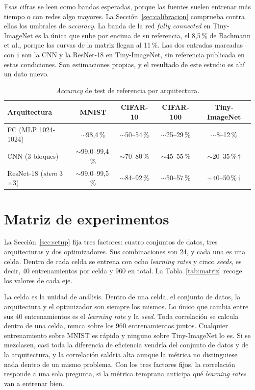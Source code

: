 Esas cifras se leen como bandas esperadas, porque las fuentes suelen entrenar más tiempo o con redes algo mayores. La Sección~\ref{sec:calibracion} comprueba contra ellas los umbrales de \emph{accuracy}. La banda de la red \emph{fully connected} en Tiny-ImageNet es la única que sube por encima de su referencia, el 8,5\,\% de Bachmann et al., porque las curvas de la matriz llegan al 11\,\%. Las dos entradas marcadas con $\dagger$ son la CNN y la ResNet-18 en Tiny-ImageNet, sin referencia publicada en estas condiciones. Son estimaciones propias, y el resultado de este estudio es ahí un dato nuevo.

\begin{table}[ht]
\centering
\small
\caption{\emph{Accuracy} de test de referencia por arquitectura.}
\label{tab:referencias}
\begin{tabular}{lcccc}
\toprule
\textbf{Arquitectura} & \textbf{MNIST} & \textbf{CIFAR-10} & \textbf{CIFAR-100} & \textbf{Tiny-ImageNet} \\
\midrule
FC (MLP 1024-1024)          & $\sim$98,4\,\%       & $\sim$50--54\,\% & $\sim$25--29\,\% & $\sim$8--12\,\% \\
CNN (3 bloques)             & $\sim$99,0--99,4\,\% & $\sim$70--80\,\% & $\sim$45--55\,\% & $\sim$20--35\,\%\,$\dagger$ \\
ResNet-18 (\emph{stem} 3$\times$3) & $\sim$99,0--99,5\,\% & $\sim$84--92\,\% & $\sim$50--57\,\% & $\sim$40--50\,\%\,$\dagger$ \\
\bottomrule
\end{tabular}
\end{table}

\section{Matriz de experimentos}
\label{sec:matriz}

La Sección~\ref{sec:setup} fija tres factores: cuatro conjuntos de datos, tres arquitecturas y dos optimizadores. Sus combinaciones son 24, y cada una es una celda. Dentro de cada celda se entrena con ocho \emph{learning rates} y cinco \emph{seeds}, es decir, 40 entrenamientos por celda y 960 en total. La Tabla~\ref{tab:matriz} recoge los valores de cada eje.

La celda es la unidad de análisis. Dentro de una celda, el conjunto de datos, la arquitectura y el optimizador son siempre los mismos. Lo único que cambia entre sus 40 entrenamientos es el \emph{learning rate} y la \emph{seed}. Toda correlación se calcula dentro de una celda, nunca sobre los 960 entrenamientos juntos. Cualquier entrenamiento sobre MNIST es rápido y ninguno sobre Tiny-ImageNet lo es. Si se mezclasen, casi toda la diferencia de eficiencia vendría del conjunto de datos y de la arquitectura, y la correlación saldría alta aunque la métrica no distinguiese nada dentro de un mismo problema. Con los tres factores fijos, la correlación responde a una sola pregunta, si la métrica temprana anticipa qué \emph{learning rates} van a entrenar bien.

